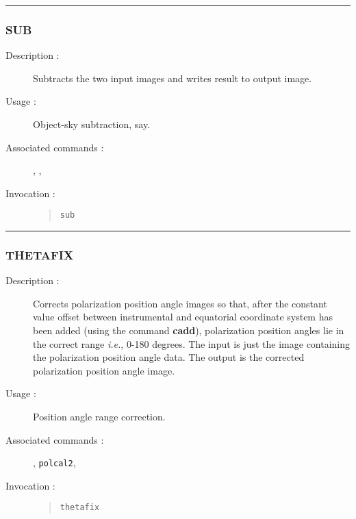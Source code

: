 \hrule
\subsubsection*{\label{SUB}SUB}

\begin{description}

\item[Description :] Subtracts the two input images and writes result
to output image.

\item[Usage :] Object-sky subtraction, say.

\item[Associated commands :] {\tt {}},
{\tt {}}, {\tt {}}

\item[Invocation :]

\begin{quote}{\tt  sub }\end{quote}

\end{description}

\hrule
\subsubsection*{\label{THETAFIX}THETAFIX}

\begin{description}

\item[Description :] Corrects polarization position angle images so
that, after the constant value offset between instrumental and
equatorial coordinate system has been added (using the command {\bf cadd}),
polarization position angles lie in the correct range \emph{i.e.},
0-180 degrees.  The input is just the image containing the polarization
position angle data.  The output is the corrected polarization position
angle image.

\item[Usage :] Position angle range correction.

\item[Associated commands :] {\tt {}},
{\tt polcal2}, {\tt {}}

\item[Invocation :]

\begin{quote}{\tt  thetafix }\end{quote}

\end{description}

